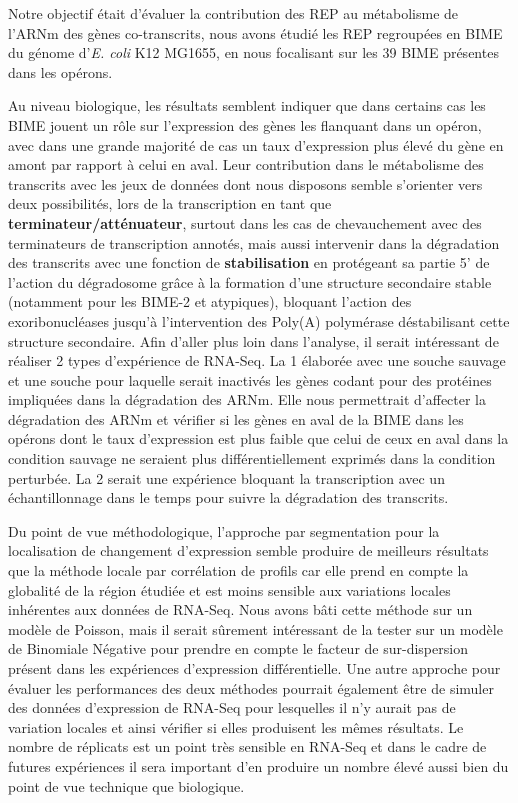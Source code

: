 \documentclass[12pt,a4paper]{report}
\begin{document}
\begin{onehalfspace}
Notre objectif était d'évaluer la contribution des REP au métabolisme de l'ARNm des gènes co-transcrits, nous avons étudié les REP regroupées en BIME du génome d'\textit{E. coli} K12 MG1655, en nous focalisant sur les 39 BIME présentes dans les opérons.

Au niveau biologique, les résultats semblent indiquer que dans certains cas les BIME jouent un rôle sur l'expression des gènes les flanquant dans un opéron, avec dans une grande majorité de cas un taux d'expression plus élevé du gène en amont par rapport à celui en aval. Leur contribution dans le métabolisme des transcrits avec les jeux de données dont nous disposons semble s'orienter vers deux possibilités, lors de la transcription en tant que \textbf{terminateur/atténuateur}, surtout dans les cas de chevauchement avec des terminateurs de transcription annotés, mais aussi intervenir dans la dégradation des transcrits avec une fonction de \textbf{stabilisation} en protégeant sa partie 5' de l'action du dégradosome grâce à la formation d'une structure secondaire stable (notamment pour les BIME-2  et atypiques), bloquant l'action des exoribonucléases jusqu'à l'intervention des Poly(A) polymérase déstabilisant cette structure secondaire. 
Afin d'aller plus loin dans l'analyse, il serait intéressant de réaliser 2 types d'expérience de RNA-Seq. La 1 élaborée avec une souche sauvage et une souche pour laquelle serait inactivés les gènes codant pour des protéines impliquées dans la dégradation des ARNm. Elle nous permettrait d'affecter la dégradation des ARNm et vérifier si les gènes en aval de la BIME dans les opérons dont le taux d'expression est plus faible que celui de ceux en aval dans la condition sauvage ne seraient plus différentiellement exprimés dans la condition perturbée. La 2 serait une expérience bloquant la transcription avec un échantillonnage dans le temps pour suivre la dégradation des transcrits.

Du point de vue méthodologique, l'approche par segmentation pour la localisation de changement d'expression semble produire de meilleurs résultats que la méthode locale par corrélation de profils car elle prend en compte la globalité de la région étudiée et est moins sensible aux variations locales inhérentes aux données de RNA-Seq. Nous avons bâti cette méthode sur un modèle de Poisson, mais il serait sûrement intéressant de la tester sur un modèle de Binomiale Négative pour prendre en compte le facteur de sur-dispersion présent dans les expériences d'expression différentielle. Une autre approche pour évaluer les performances des deux méthodes pourrait également être de simuler des données d'expression de RNA-Seq pour lesquelles il n'y aurait pas de variation locales et ainsi vérifier si elles produisent les mêmes résultats.
Le nombre de réplicats est un point très sensible en RNA-Seq et dans le cadre de futures expériences il sera important d'en produire un nombre élevé aussi bien du point de vue technique que biologique.

\end{onehalfspace}
\end{document}
